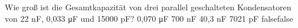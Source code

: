     {Wie groß ist die Gesamtkapazität von drei parallel geschalteten Kondensatoren von 22 nF, 0,033 \si{\micro\farad} und 15000 pF?}
    {0,070 \si{\micro\farad}}
    {700 nF}
    {40,3 nF}
    {7021 pF}
    {false}{false}